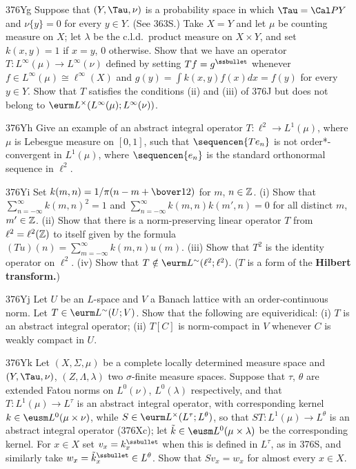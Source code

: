 {\spheader 376Yg Suppose that $(Y,\Tau,\nu)$ is a probability space in
which $\Tau=\Cal PY$ and $\nu\{y\}=0$ for every $y\in Y$.    (See
363S.)   Take $X=Y$ and let $\mu$ be counting measure on $X$;  let
$\lambda$ be the c.l.d.\ product measure on $X\times Y$, and set
$k(x,y)=1$ if $x=y$, $0$ otherwise.   Show that we have an operator
$T:L^{\infty}(\mu)\to L^{\infty}(\nu)$ defined by setting
$Tf=g^{\ssbullet}$ whenever $f\in L^{\infty}(\mu)\cong\ell^{\infty}(X)$
and $g(y)=\int k(x,y)f(x)dx=f(y)$ for every $y\in Y$.   Show that $T$
satisfies the conditions (ii) and (iii) of 376J but does not belong to
$\eurm L^{\times}(L^{\infty}(\mu);L^{\infty}(\nu))$.

\spheader 376Yh Give an example of an abstract integral operator
$T:\ell^2\to L^1(\mu)$, where $\mu$ is Lebesgue measure on $[0,1]$, such
that $\sequencen{Te_n}$ is not order*-convergent in $L^1(\mu)$, where
$\sequencen{e_n}$ is the standard orthonormal sequence in $\ell^2$.

\spheader 376Yi Set $k(m,n)=1/\pi(n-m+\bover12)$ for $m$, $n\in\Bbb Z$.
(i) Show that
$\sum_{n=-\infty}^{\infty}k(m,n)^2=1$ and
$\sum_{n=-\infty}^{\infty}k(m,n)k(m',n)=0$ for all distinct $m$,
$m'\in\Bbb Z$.   
(ii) Show that there is a norm-preserving linear operator $T$ from
$\ell^2=\ell^2(\Bbb Z)$ to itself given by the formula
$(Tu)(n)=\sum_{m=-\infty}^{\infty}k(m,n)u(m)$.   (iii) Show
that $T^2$ is the identity operator on $\ell^2$.   (iv) Show that
$T\notin\eurm L^{\sim}(\ell^2;\ell^2)$.      ($T$ is a form of the
{\bf Hilbert transform.})

\spheader 376Yj Let $U$ be an $L$-space and $V$ a Banach lattice with an
order-continuous norm.   Let $T\in\eurm L^{\sim}(U;V)$.   Show that the
following are equiveridical:  (i) $T$ is an abstract integral operator;
(ii) $T[C]$ is norm-compact in $V$ whenever $C$ is weakly compact in
$U$.   

\spheader 376Yk Let $(X,\Sigma,\mu)$ be a complete locally determined
measure space and $(Y,\Tau,\nu)$, $(Z,\Lambda,\lambda)$ two
$\sigma$-finite measure spaces.   Suppose that $\tau$, $\theta$ are
extended Fatou norms on $L^0(\nu)$, $L^0(\lambda)$ respectively, and
that $T:L^1(\mu)\to L^{\tau}$ is an abstract integral operator, with
corresponding kernel $k\in\eusm L^0(\mu\times\nu)$, while $S\in\eurm
L^{\times}(L^{\tau};L^{\theta})$, so that $ST:L^1(\mu)\to L^{\theta}$ is
an abstract integral operator (376Xc);  let
$\tilde k\in\eusm L^0(\mu\times\lambda)$ be the corresponding kernel.
For $x\in X$ set
$v_x=k_x^{\ssbullet}$ when this is defined in $L^{\tau}$, as in 376S,
and similarly take $w_x=\tilde k_x^{\ssbullet}\in L^{\theta}$.   Show
that $Sv_x=w_x$ for almost every $x\in X$.
}%

